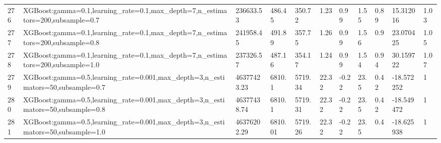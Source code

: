 \begin{longtable}{C{0.8cm} L{2cm} C{1.15cm} C{1.15cm} C{1.15cm} C{1.15cm} C{0.85cm} C{1.25cm} C{1.2cm} C{1.5cm} C{1.0cm}}
276 & XGBoost:\newline gamma=0.1,\newline learning\_rate=0.1,\newline max\_depth=7,\newline n\_estimators=200,\newline subsample=0.7 & 236633.53 & 486.45 & 350.72 & 1.23 & 0.99 & 1.55 & 0.89 & 15.312016 & 1.03 \\
277 & XGBoost:\newline gamma=0.1,\newline learning\_rate=0.1,\newline max\_depth=7,\newline n\_estimators=200,\newline subsample=0.8 & 241958.45 & 491.89 & 357.75 & 1.26 & 0.99 & 1.56 & 0.9 & 23.070425 & 1.05 \\
278 & XGBoost:\newline gamma=0.1,\newline learning\_rate=0.1,\newline max\_depth=7,\newline n\_estimators=200,\newline subsample=1.0 & 237326.57 & 487.16 & 354.17 & 1.24 & 0.99 & 1.54 & 0.94 & 30.159722 & 1.07 \\
279 & XGBoost:\newline gamma=0.5,\newline learning\_rate=0.001,\newline max\_depth=3,\newline n\_estimators=50,\newline subsample=0.7 & 46377423.23 & 6810.1 & 5719.34 & 22.32 & -0.22 & 23.5 & 0.42 & -18.572252 & 1 \\
280 & XGBoost:\newline gamma=0.5,\newline learning\_rate=0.001,\newline max\_depth=3,\newline n\_estimators=50,\newline subsample=0.8 & 46377438.74 & 6810.1 & 5719.31 & 22.32 & -0.22 & 23.5 & 0.42 & -18.549472 & 1 \\
281 & XGBoost:\newline gamma=0.5,\newline learning\_rate=0.001,\newline max\_depth=3,\newline n\_estimators=50,\newline subsample=1.0 & 46376202.29 & 6810.01 & 5719.26 & 22.32 & -0.22 & 23.5 & 0.4 & -18.625938 & 1 \\

\end{longtable}
